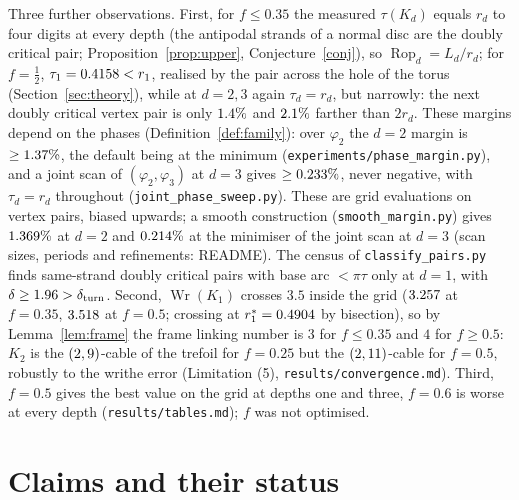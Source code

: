 \documentclass[10pt,a4paper]{article}
\theoremstyle{plain}
\theoremstyle{definition}
\theoremstyle{remark}
\newcommand{\Rop}{\operatorname{Rop}}
\newcommand{\Wr}{\operatorname{Wr}}
\begin{document}
Three further observations. First, for $f\le0.35$ the measured $\tau(K_d)$ equals $r_d$ to four digits at every depth (the antipodal strands of a normal disc are the doubly critical pair; Proposition~\ref{prop:upper}, Conjecture~\ref{conj}), so $\Rop_d=L_d/r_d$; for $f=\frac12$, $\tau_1=0.4158<r_1$, realised by the pair across the hole of the torus (Section~\ref{sec:theory}), while at $d=2,3$ again $\tau_d=r_d$, but narrowly: the next doubly critical vertex pair is only $1.4\%$ and $2.1\%$ farther than $2r_d$. These margins depend on the phases (Definition~\ref{def:family}): over $\varphi_2$ the $d=2$ margin is $\ge1.37\%$, the default being at the minimum (\texttt{experiments/phase\_margin.py}), and a joint scan of $(\varphi_2,\varphi_3)$ at $d=3$ gives $\ge0.233\%$, never negative, with $\tau_d=r_d$ throughout (\texttt{joint\_phase\_sweep.py}). These are grid evaluations on vertex pairs, biased upwards; a smooth construction (\texttt{smooth\_margin.py}) gives $1.369\%$ at $d=2$ and $0.214\%$ at the minimiser of the joint scan at $d=3$ (scan sizes, periods and refinements: README). The census of \texttt{classify\_pairs.py} finds same-strand doubly critical pairs with base arc $<\pi\tau$ only at $d=1$, with $\delta\ge1.96>\delta_{\rm turn}$. Second, $\Wr(K_1)$ crosses $3.5$ inside the grid ($3.257$ at $f=0.35$, $3.518$ at $f=0.5$; crossing at $r_1^\ast=0.4904$ by bisection), so by Lemma~\ref{lem:frame} the frame linking number is $3$ for $f\le0.35$ and $4$ for $f\ge0.5$: $K_2$ is the $(2,9)$-cable of the trefoil for $f=0.25$ but the $(2,11)$-cable for $f=0.5$, robustly to the writhe error (Limitation (5), \texttt{results/convergence.md}). Third, $f=0.5$ gives the best value on the grid at depths one and three, $f=0.6$ is worse at every depth (\texttt{results/tables.md}); $f$ was not optimised.





\section{Claims and their status}\label{sec:claims}
\end{document}
